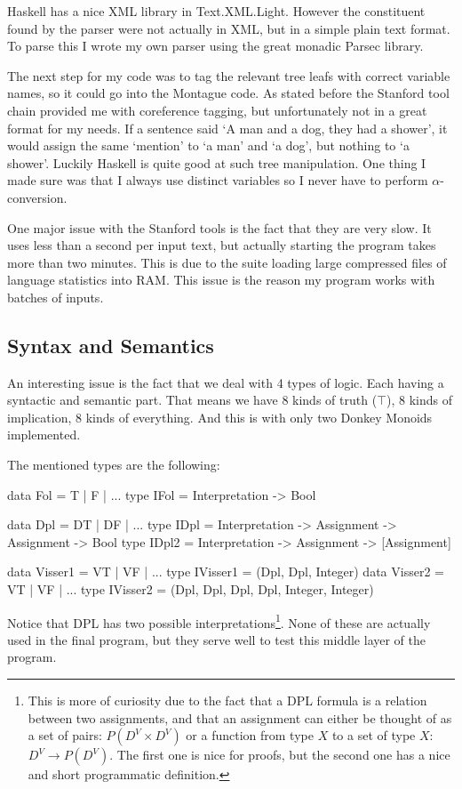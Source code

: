 \documentclass[12pt]{article}
\begin{document}
Haskell has a nice XML library in Text.XML.Light. However the constituent found by the parser were not actually in XML, but in a simple plain text format. To parse this I wrote my own parser using the great monadic Parsec library.

The next step for my code was to tag the relevant tree leafs with correct variable names, so it could go into the Montague code. As stated before the Stanford tool chain provided me with coreference tagging, but unfortunately not in a great format for my needs. If a sentence said `A man and a dog, they had a shower', it would assign the same `mention' to `a man' and `a dog', but nothing to `a shower'. Luckily Haskell is quite good at such tree manipulation. One thing I made sure was that I always use distinct variables so I never have to perform $\alpha$-conversion.

One major issue with the Stanford tools is the fact that they are very slow. It uses less than a second per input text, but actually starting the program takes more than two minutes. This is due to the suite loading large compressed files of language statistics into RAM. This issue is the reason my program works with batches of inputs.

\subsection{Syntax and Semantics}

An interesting issue is the fact that we deal with 4 types of logic. Each having a syntactic and semantic part. That means we have 8 kinds of truth ($\top$), 8 kinds of implication, 8 kinds of everything. And this is with only two Donkey Monoids implemented.

The mentioned types are the following:

\begin{haskell}
data Fol = T | F | ...
type IFol = Interpretation -> Bool

data Dpl = DT | DF | ...
type IDpl = Interpretation -> Assignment -> Assignment -> Bool
type IDpl2 = Interpretation -> Assignment -> [Assignment]

data Visser1 = VT | VF | ...
type IVisser1 = (Dpl, Dpl, Integer)
data Visser2 = VT | VF | ...
type IVisser2 = (Dpl, Dpl, Dpl, Dpl, Integer, Integer)
\end{haskell}

Notice that DPL has two possible interpretations\footnote{This is more of curiosity due to the fact that a DPL formula is a relation between two assignments, and that an assignment can either be thought of as a set of pairs: $P(D^V \times D^V)$ or a function from type $X$ to a set of type $X$: $D^V \rightarrow P(D^V)$. The first one is nice for proofs, but the second one has a nice and short programmatic definition.}. None of these are actually used in the final program, but they serve well to test this middle layer of the program.
\end{document}
